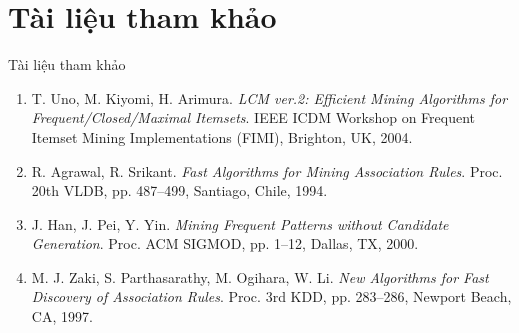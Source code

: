 \documentclass[9pt, aspectratio=169]{beamer}
\begin{document}
\section{Tài liệu tham khảo}
\begin{frame}{Tài liệu tham khảo}
  \small
  \begin{enumerate}
    \item T. Uno, M. Kiyomi, H. Arimura. \textit{LCM ver.2: Efficient Mining
      Algorithms for Frequent/Closed/Maximal Itemsets}. IEEE ICDM Workshop on
      Frequent Itemset Mining Implementations (FIMI), Brighton, UK, 2004.
    \item R. Agrawal, R. Srikant. \textit{Fast Algorithms for Mining
      Association Rules}. Proc. 20th VLDB, pp. 487--499, Santiago, Chile, 1994.
    \item J. Han, J. Pei, Y. Yin. \textit{Mining Frequent Patterns without
      Candidate Generation}. Proc. ACM SIGMOD, pp. 1--12, Dallas, TX, 2000.
    \item M. J. Zaki, S. Parthasarathy, M. Ogihara, W. Li. \textit{New
      Algorithms for Fast Discovery of Association Rules}. Proc. 3rd KDD,
      pp. 283--286, Newport Beach, CA, 1997.
  \end{enumerate}
\end{frame}
\end{document}
